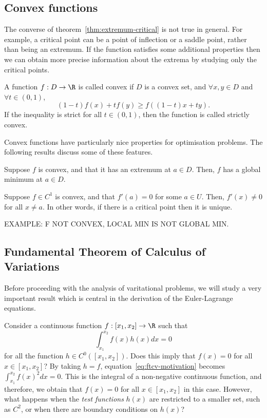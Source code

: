 \subsection{Convex functions}
The converse of theorem~\ref{thm:extremum-critical} is not true in general. For example, a critical point can be a point of inflection or a saddle point, rather than being an extremum. If the function satisfies some additional properties then we can obtain more precise information about the extrema by studying only the critical points.
\begin{ndfn}
  A function $f:D \to \R$ is called convex if $D$ is a convex set, and $\forall x, y \in D$ and $\forall t \in (0,1)$,
  \begin{equation}
    (1-t) f(x) + t f(y) \geq f\left((1-t)x + ty\right).
  \end{equation}
  If the inequality is strict for all $t \in (0,1)$, then the function is called strictly convex.
\end{ndfn}
Convex functions have particularly nice properties for optimisation problems. The following results discuss some of these features.
\begin{nprop}
  Suppose $f$ is convex, and that it has an extremum at $a \in D$. Then, $f$ has a global minimum at $a \in D$.
\end{nprop}
\begin{nprop}
  Suppose $f \in C^{1}$ is convex, and that $f'(a)=0$ for some $a \in U$. Then, $f'(x) \neq 0$ for all $x \neq a$. In other words, if there is a critical point then it is unique.
\end{nprop}

EXAMPLE: F NOT CONVEX, LOCAL MIN IS NOT GLOBAL MIN.


\subsection{Fundamental Theorem of Calculus of Variations}
Before proceeding with the analysis of varitational problems, we will study a very important result which is central in the derivation of the Euler-Lagrange equations.

Consider a continuous function $f : [x_1, x_2] \to \R$ such that
\begin{equation}
  \label{eq:ftcv-motivation}
  \int_{x_1}^{x_2} f(x) h(x) dx = 0
\end{equation}
for all the function $h \in C^{0}([x_1, x_2])$. Does this imply that $f(x)=0$ for all $x \in [x_1, x_2]$? By taking $h = f$, equation~\eqref{eq:ftcv-motivation} becomes $\int_{x_1}^{x_2} f(x)^2 dx = 0$. This is the integral of a non-negative continuous function, and therefore, we obtain that $f(x)=0$ for all $x \in [x_1, x_2]$ in this case. However, what happens when the \emph{test functions} $h(x)$ are restricted to a smaller set, such as $C^{2}$, or when there are boundary conditions on $h(x)$?

